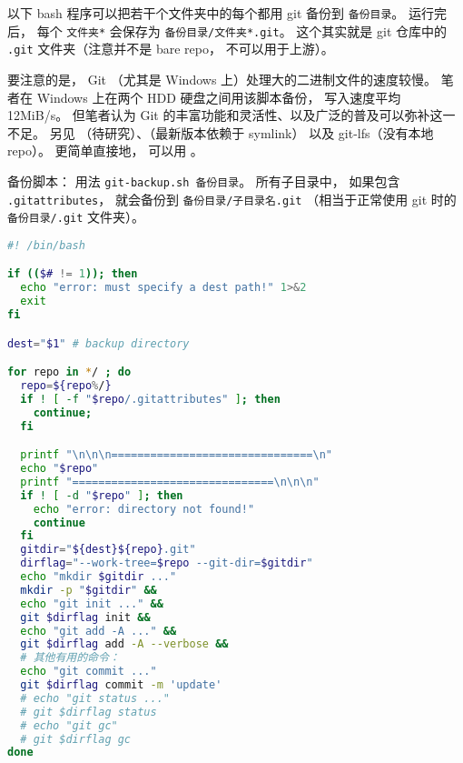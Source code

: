 
\begin{issues}
\issueDraft
\end{issues}


以下 bash 程序可以把若干个文件夹中的每个都用 git 备份到 \verb|备份目录|。 运行完后， 每个 \verb|文件夹*| 会保存为 \verb|备份目录/文件夹*.git|。 这个其实就是 git 仓库中的 \verb|.git| 文件夹（注意并不是 bare repo， 不可以用于上游）。

要注意的是， Git （尤其是 Windows 上）处理大的二进制文件的速度较慢。 笔者在 Windows 上在两个 HDD 硬盘之间用该脚本备份， 写入速度平均 12MiB/s。 但笔者认为 Git 的丰富功能和灵活性、以及广泛的普及可以弥补这一不足。 另见 （待研究）、（最新版本依赖于 symlink） 以及 git-lfs（没有本地repo）。 更简单直接地， 可以用 。

备份脚本： 用法 \verb|git-backup.sh 备份目录|。 所有子目录中， 如果包含 \verb|.gitattributes|， 就会备份到 \verb|备份目录/子目录名.git| （相当于正常使用 git 时的 \verb|备份目录/.git| 文件夹）。
\begin{lstlisting}[language=bash, caption=git-backup.sh]
#! /bin/bash

if (($# != 1)); then
  echo "error: must specify a dest path!" 1>&2
  exit
fi

dest="$1" # backup directory

for repo in */ ; do
  repo=${repo%/}
  if ! [ -f "$repo/.gitattributes" ]; then
    continue;
  fi

  printf "\n\n\n===============================\n"
  echo "$repo"
  printf "===============================\n\n\n"
  if ! [ -d "$repo" ]; then
    echo "error: directory not found!"
    continue
  fi
  gitdir="${dest}${repo}.git"
  dirflag="--work-tree=$repo --git-dir=$gitdir"
  echo "mkdir $gitdir ..."
  mkdir -p "$gitdir" &&
  echo "git init ..." &&
  git $dirflag init &&
  echo "git add -A ..." &&
  git $dirflag add -A --verbose &&
  # 其他有用的命令：
  echo "git commit ..."
  git $dirflag commit -m 'update'
  # echo "git status ..."
  # git $dirflag status
  # echo "git gc"
  # git $dirflag gc
done
\end{lstlisting}

